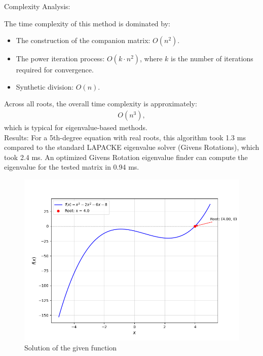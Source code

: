 \documentclass[journal]{IEEEtran}
\begin{document}
 Complexity Analysis:  
 
 The time complexity of this method is dominated by:
 \begin{itemize}
 	\item The construction of the companion matrix: $O(n^2)$.
 	\item The power iteration process: $O(k \cdot n^2)$, where $k$ is the number of iterations required for convergence.
 	\item Synthetic division: $O(n)$.
 \end{itemize}
 
 Across all roots, the overall time complexity is approximately:
 \begin{align}
 	O(n^3),
 \end{align}
 which is typical for eigenvalue-based methods. \\
Results: For a 5th-degree equation with real roots, this algorithm took 1.3 ms compared to the standard LAPACKE eigenvalue solver (Givens Rotations), which took 2.4 ms. An optimized Givens Rotation eigenvalue finder can compute the eigenvalue for the tested matrix in 0.94 ms.

	\begin{figure}[h!]
		\centering
		\includegraphics[width=\columnwidth]{figs/fig1.png}
		\caption{Solution of the given function}
		\label{stemplot}
	\end{figure}
	
	
\end{document}
